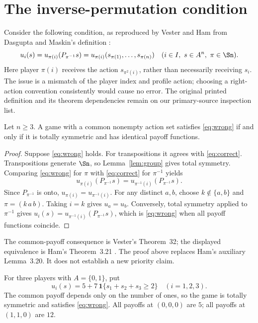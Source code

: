 \section{The inverse-permutation condition}
Consider the following condition, as reproduced by Vester and Ham from
Dasgupta and Maskin's definition \citep{vester2012,ham2021,dm1986}:
\begin{equation}\label{eq:wrong}
 u_i(s)=u_{\pi(i)}(P_{\pi^{-1}}s)
       =u_{\pi(i)}(s_{\pi(1)},\ldots,s_{\pi(n)})
 \quad(i\in I,\ s\in A^n,\ \pi\in\Sn).
\end{equation}
Here player $\pi(i)$ receives the action $s_{\pi^2(i)}$, rather than
necessarily receiving $s_i$. The issue is a mismatch of the player index and
profile action; choosing a right-action convention consistently would cause
no error. The original printed definition and its theorem dependencies remain
on our primary-source inspection list.

\begin{theorem}\label{thm:dm}
Let $n\ge3$. A game with a common nonempty action set satisfies
\eqref{eq:wrong} if and only if it is totally symmetric and has identical
payoff functions.
\end{theorem}
\begin{proof}
Suppose \eqref{eq:wrong} holds. For transpositions it agrees with
\eqref{eq:correct}. Transpositions generate $\Sn$, so
Lemma~\ref{lem:group} gives total symmetry.
Comparing \eqref{eq:wrong} for $\pi$ with \eqref{eq:correct} for $\pi^{-1}$
yields
\[
 u_{\pi(i)}(P_{\pi^{-1}}s)
 =u_{\pi^{-1}(i)}(P_{\pi^{-1}}s).
\]
Since $P_{\pi^{-1}}$ is onto, $u_{\pi(i)}=u_{\pi^{-1}(i)}$.
For any distinct $a,b$, choose $k\notin\{a,b\}$ and
$\pi=(k\,a\,b)$. Taking $i=k$ gives $u_a=u_b$.
Conversely, total symmetry applied to $\pi^{-1}$ gives
$u_i(s)=u_{\pi^{-1}(i)}(P_{\pi^{-1}}s)$, which is
\eqref{eq:wrong} when all payoff functions coincide.
\end{proof}
The common-payoff consequence is Vester's Theorem~32; the displayed equivalence
is Ham's Theorem~3.21 \citep{vester2012,ham2021}. The proof above replaces
Ham's auxiliary Lemma~3.20. It does not establish a new priority claim.

\begin{example}
For three players with $A=\{0,1\}$, put
\[
 u_i(s)=5+7\,\mathbf 1\{s_1+s_2+s_3\ge2\}\quad(i=1,2,3).
\]
The common payoff depends only on the number of ones, so the game is totally
symmetric and satisfies \eqref{eq:wrong}. All payoffs at $(0,0,0)$ are $5$;
all payoffs at $(1,1,0)$ are $12$.
\end{example}

